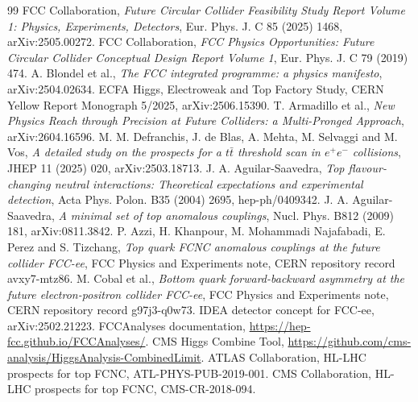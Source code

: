 \documentclass[11pt,a4paper]{report}
\begin{document}
\begin{thebibliography}{99}
 FCC Collaboration, \emph{Future Circular Collider Feasibility Study Report Volume 1: Physics, Experiments, Detectors}, Eur. Phys. J. C 85 (2025) 1468, arXiv:2505.00272.
 FCC Collaboration, \emph{FCC Physics Opportunities: Future Circular Collider Conceptual Design Report Volume 1}, Eur. Phys. J. C 79 (2019) 474.
 A. Blondel et al., \emph{The FCC integrated programme: a physics manifesto}, arXiv:2504.02634.
 ECFA Higgs, Electroweak and Top Factory Study, CERN Yellow Report Monograph 5/2025, arXiv:2506.15390.
 T. Armadillo et al., \emph{New Physics Reach through Precision at Future Colliders: a Multi-Pronged Approach}, arXiv:2604.16596.
 M. M. Defranchis, J. de Blas, A. Mehta, M. Selvaggi and M. Vos, \emph{A detailed study on the prospects for a $t\bar t$ threshold scan in $e^+e^-$ collisions}, JHEP 11 (2025) 020, arXiv:2503.18713.
 J. A. Aguilar-Saavedra, \emph{Top flavour-changing neutral interactions: Theoretical expectations and experimental detection}, Acta Phys. Polon. B35 (2004) 2695, hep-ph/0409342.
 J. A. Aguilar-Saavedra, \emph{A minimal set of top anomalous couplings}, Nucl. Phys. B812 (2009) 181, arXiv:0811.3842.
 P. Azzi, H. Khanpour, M. Mohammadi Najafabadi, E. Perez and S. Tizchang, \emph{Top quark FCNC anomalous couplings at the future collider FCC-ee}, FCC Physics and Experiments note, CERN repository record avxy7-mtz86.
 M. Cobal et al., \emph{Bottom quark forward-backward asymmetry at the future electron-positron collider FCC-ee}, FCC Physics and Experiments note, CERN repository record g97j3-q0w73.
 IDEA detector concept for FCC-ee, arXiv:2502.21223.
 FCCAnalyses documentation, \url{https://hep-fcc.github.io/FCCAnalyses/}.
 CMS Higgs Combine Tool, \url{https://github.com/cms-analysis/HiggsAnalysis-CombinedLimit}.
 ATLAS Collaboration, HL-LHC prospects for top FCNC, ATL-PHYS-PUB-2019-001.
 CMS Collaboration, HL-LHC prospects for top FCNC, CMS-CR-2018-094.
\end{thebibliography}
\end{document}
